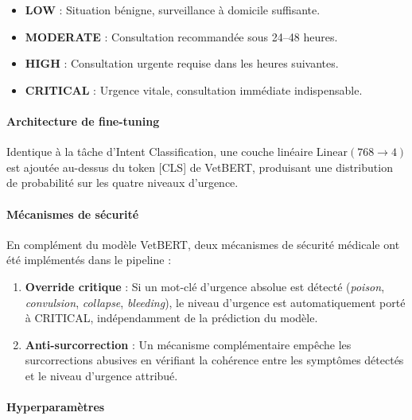 \begin{itemize}
    \item \textbf{LOW} : Situation bénigne, surveillance à domicile suffisante.
    \item \textbf{MODERATE} : Consultation recommandée sous 24--48 heures.
    \item \textbf{HIGH} : Consultation urgente requise dans les heures suivantes.
    \item \textbf{CRITICAL} : Urgence vitale, consultation immédiate indispensable.
\end{itemize}

\paragraph{Architecture de fine-tuning}

Identique à la tâche d'Intent Classification, une couche linéaire $\text{Linear}(768 \rightarrow 4)$ est ajoutée au-dessus du token [CLS] de VetBERT, produisant une distribution de probabilité sur les quatre niveaux d'urgence.

\paragraph{Mécanismes de sécurité}

En complément du modèle VetBERT, deux mécanismes de sécurité médicale ont été implémentés dans le pipeline :

\begin{enumerate}
    \item \textbf{Override critique} : Si un mot-clé d'urgence absolue est détecté (\textit{poison}, \textit{convulsion}, \textit{collapse}, \textit{bleeding}), le niveau d'urgence est automatiquement porté à CRITICAL, indépendamment de la prédiction du modèle.

    \item \textbf{Anti-surcorrection} : Un mécanisme complémentaire empêche les surcorrections abusives en vérifiant la cohérence entre les symptômes détectés et le niveau d'urgence attribué.
\end{enumerate}

\paragraph{Hyperparamètres}

